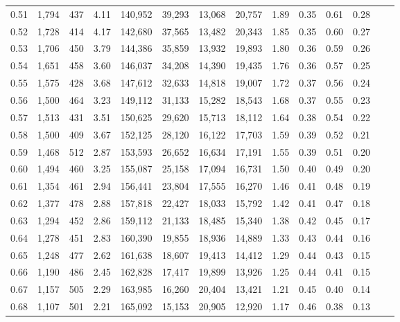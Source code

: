 \begin{tabular}{rrrrrrrrrrrrrr}
0.51 &  1,794 &  437 &    4.11 &  140,952 &   39,293 &  13,068 &  20,757 &  1.89 &  0.35 &  0.61 &      0.28 \\
0.52 &  1,728 &  414 &    4.17 &  142,680 &   37,565 &  13,482 &  20,343 &  1.85 &  0.35 &  0.60 &      0.27 \\
0.53 &  1,706 &  450 &    3.79 &  144,386 &   35,859 &  13,932 &  19,893 &  1.80 &  0.36 &  0.59 &      0.26 \\
0.54 &  1,651 &  458 &    3.60 &  146,037 &   34,208 &  14,390 &  19,435 &  1.76 &  0.36 &  0.57 &      0.25 \\
0.55 &  1,575 &  428 &    3.68 &  147,612 &   32,633 &  14,818 &  19,007 &  1.72 &  0.37 &  0.56 &      0.24 \\
0.56 &  1,500 &  464 &    3.23 &  149,112 &   31,133 &  15,282 &  18,543 &  1.68 &  0.37 &  0.55 &      0.23 \\
0.57 &  1,513 &  431 &    3.51 &  150,625 &   29,620 &  15,713 &  18,112 &  1.64 &  0.38 &  0.54 &      0.22 \\
0.58 &  1,500 &  409 &    3.67 &  152,125 &   28,120 &  16,122 &  17,703 &  1.59 &  0.39 &  0.52 &      0.21 \\
0.59 &  1,468 &  512 &    2.87 &  153,593 &   26,652 &  16,634 &  17,191 &  1.55 &  0.39 &  0.51 &      0.20 \\
0.60 &  1,494 &  460 &    3.25 &  155,087 &   25,158 &  17,094 &  16,731 &  1.50 &  0.40 &  0.49 &      0.20 \\
0.61 &  1,354 &  461 &    2.94 &  156,441 &   23,804 &  17,555 &  16,270 &  1.46 &  0.41 &  0.48 &      0.19 \\
0.62 &  1,377 &  478 &    2.88 &  157,818 &   22,427 &  18,033 &  15,792 &  1.42 &  0.41 &  0.47 &      0.18 \\
0.63 &  1,294 &  452 &    2.86 &  159,112 &   21,133 &  18,485 &  15,340 &  1.38 &  0.42 &  0.45 &      0.17 \\
0.64 &  1,278 &  451 &    2.83 &  160,390 &   19,855 &  18,936 &  14,889 &  1.33 &  0.43 &  0.44 &      0.16 \\
0.65 &  1,248 &  477 &    2.62 &  161,638 &   18,607 &  19,413 &  14,412 &  1.29 &  0.44 &  0.43 &      0.15 \\
0.66 &  1,190 &  486 &    2.45 &  162,828 &   17,417 &  19,899 &  13,926 &  1.25 &  0.44 &  0.41 &      0.15 \\
0.67 &  1,157 &  505 &    2.29 &  163,985 &   16,260 &  20,404 &  13,421 &  1.21 &  0.45 &  0.40 &      0.14 \\
0.68 &  1,107 &  501 &    2.21 &  165,092 &   15,153 &  20,905 &  12,920 &  1.17 &  0.46 &  0.38 &      0.13 \\

\end{tabular}
